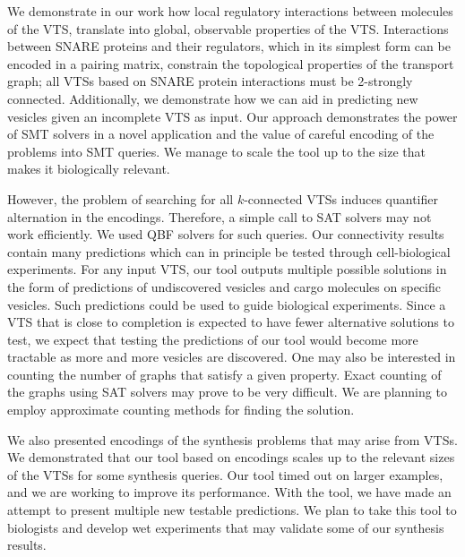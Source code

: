 \noindent 
We demonstrate in our work how local regulatory interactions between molecules of the VTS, translate into global, observable properties of the VTS. 
%
Interactions between SNARE proteins and their regulators, which in its simplest form can be encoded in a pairing matrix, constrain the topological properties of the transport graph; all VTSs based on SNARE protein interactions must be 2-strongly connected. 
%
Additionally, we demonstrate how we can aid in predicting new vesicles given an incomplete VTS as input. 
%
Our approach demonstrates the power of SMT solvers in a novel application and the value of careful encoding of the problems into SMT queries. 
%
We manage to scale the tool up to the size that makes it biologically relevant.
%
%

However, the problem of searching for all $k$-connected VTSs induces quantifier alternation in the encodings. 
%
Therefore, a simple call to SAT solvers may not work efficiently. 
%
We used QBF solvers for such queries. Our connectivity results contain many predictions which can in principle be tested through cell-biological experiments. 
%
For any input VTS, our tool outputs multiple possible solutions in the form of predictions of undiscovered vesicles and cargo molecules on specific vesicles. 
%
Such predictions could be used to guide biological experiments. Since a VTS that is close to completion is expected to have fewer alternative solutions to test, we expect that testing the predictions of our tool would become more tractable as more and more vesicles are discovered. 
%
One may also be interested in counting the number of graphs that satisfy a given property. 
%
Exact counting of the graphs using SAT solvers may prove to be very difficult. We are planning to employ approximate counting methods for finding the solution.

We also presented encodings of the synthesis problems that may arise from VTSs.
%
We demonstrated that our tool based on encodings
scales up to the relevant sizes of the VTSs for some synthesis queries.
%
Our tool timed out on larger examples, and we are working to improve its performance.
%
%
With the tool, we have made an attempt to present multiple new testable predictions. 
%
We plan to take this tool to biologists and develop wet experiments that may
validate some of our synthesis results.
%
%


